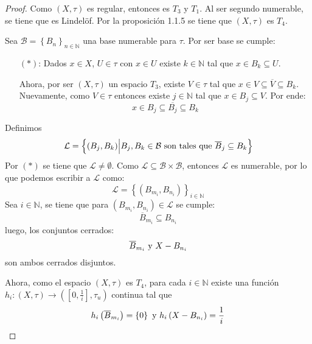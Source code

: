 \documentclass[12pt]{report}
\theoremstyle{largebreak}
\newcommand\cf[3]{\ensuremath{#1:#2\rightarrow#3}}
\begin{document}
    \begin{proof}
        Como $(X,\tau)$ es regular, entonces es $T_3$ y $T_1$. Al ser segundo numerable, se tiene que es Lindelöf. Por la proposición 1.1.5 se tiene que $(X,\tau)$ es $T_4$.

        Sea $\mathcal{B}=\left\{B_n \right\}_{ n\in\mathbb{N}}$ una base numerable para $\tau$. Por ser base se cumple:
        \begin{itemize}
            \item[$(*)$:] Dados $x\in X$, $U\in\tau$ con $x\in U$ existe $k\in\mathbb{N}$ tal que $x\in B_k\subseteq U$.
            
            Ahora, por ser $(X,\tau)$ un espacio $T_3$, existe $V\in\tau$ tal que $x\in V\subseteq\overline{V}\subseteq B_k$. Nuevamente, como $V\in\tau$ entonces existe $j\in\mathbb{N}$ tal que $x\in B_j\subseteq V$. Por ende:
            \begin{equation*}
                x\in B_j\subseteq\overline{B_j}\subseteq B_k
            \end{equation*}
        \end{itemize}

        Definimos
        \begin{equation*}
            \mathcal{L}=\left\{(B_j,B_k)\Big|B_j,B_k\in\mathcal{B}\textup{ son tales que }\overline{B}_j\subseteq B_k \right\}
        \end{equation*}
        Por $(*)$ se tiene que $\mathcal{L}\neq\emptyset$. Como $\mathcal{L}\subseteq\mathcal{B}\times\mathcal{B}$, entonces $\mathcal{L}$ es numerable, por lo que podemos escribir a $\mathcal{L}$ como:
        \begin{equation*}
            \mathcal{L}=\left\{(B_{ m_i},B_{ n_i}) \right\}_{ i\in\mathbb{N}}
        \end{equation*}
        Sea $i\in\mathbb{N}$, se tiene que para $(B_{ m_i},B_{ n_i})\in\mathcal{L}$ se cumple:
        \begin{equation*}
            \overline{B}_{ m_i}\subseteq B_{ n_i}
        \end{equation*}
        luego, los conjuntos cerrados:
        \begin{equation*}
            \overline{B}_{ m_i}\textup{ y }X-B_{ n_i}
        \end{equation*}
        son ambos cerrados disjuntos.

        Ahora, como el espacio $(X,\tau)$ es $T_4$, para cada $i\in\mathbb{N}$ existe una función $\cf{h_i}{(X,\tau)}{(\left[0,\frac{1}{i}\right],\tau_u)}$ continua tal que
        \begin{equation*}
            h_i\left(\overline{B}_{ m_i}\right)=\left\{0\right\}\textup{ y }h_i\left(X-B_{ n_i}\right)=\frac{1}{i}
        \end{equation*}
        

\end{proof}
\end{document}
